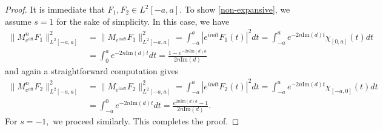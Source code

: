\documentclass[10pt,a4paper]{amsart}
\begin{document}
\begin{proof}
It is immediate that $F_1,F_2\in L^2[-a,a].$ To show \eqref{non-expansive}, we assume  $s=1$ for the sake of simplicity.  In this case, we have
\begin{align*}
\|M^n_{e^{idt}}F_1\|_{L^2[-a,a]}^2&=\|M_{e^{indt}}F_1\|_{L^2[-a,a]}^2=\int^a_{-a}|e^{indt}F_1(t)|^2dt=\int^a_{-a}e^{-2n\mathrm{Im}(d)t}\chi_{[0,a]}(t)dt\\
&=\int_0^ae^{-2n\mathrm{Im}(d)t}dt=\frac{1-e^{-2n\mathrm{Im}(d)a}}{2n\mathrm{Im}(d)}
\end{align*}
and again a straightforward computation gives
\begin{align*}
\|M^n_{e^{idt}}F_2\|_{L^2[-a,a]}^2&=\|M_{e^{indt}}F_2\|_{L^2[-a,a]}^2=\int^a_{-a}|e^{indt}F_2(t)|^2dt=\int^a_{-a}e^{-2n\mathrm{Im}(d)t}\chi_{[-a,0]}(t)dt\\
&=\int^0_{-a}e^{-2n\mathrm{Im}(d)t}dt=\frac{e^{2n\mathrm{Im}(d)a}-1}{2n\mathrm{Im}(d)}.
\end{align*}
For $s=-1,$ we proceed similarly. This completes the proof.
\end{proof}
\end{document}
